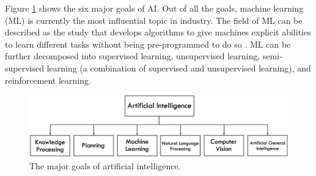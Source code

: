 Figure \ref{fig:AIGoals} shows the six major goals of AI.  Out of all the goals, machine learning (ML) is currently the most influential topic in industry.  The field of ML can be described as the study that develops algorithms to give machines explicit abilities to learn different tasks without being pre-programmed to do so \cite{AI}.  ML can be further decomposed into supervised learning, unsupervised learning, semi-supervised learning (a combination of supervised and unsupervised learning), and reinforcement learning.

\begin{figure}[H]
    \centering
    \includegraphics[width=\textwidth]{images/ch1/AIGoals.jpeg}
    \caption{The major goals of artificial intelligence.}
    \label{fig:AIGoals}
\end{figure}   

